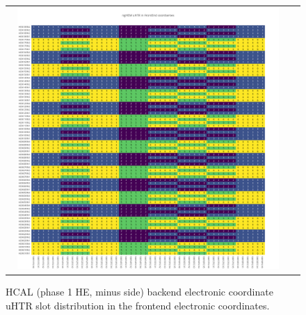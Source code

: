 \begin{figure}[htb]
 \begin{center}
  \begin{tabular}{cc}
   \includegraphics[angle=0,width=0.95\textwidth]{figures/appendix/ngHEM_uHTR_in_FrontEnd.png}
  \end{tabular}
  \caption{HCAL (phase 1 HE, minus side) backend electronic coordinate uHTR slot distribution in the frontend electronic coordinates.}
  \label{fig:lmapngHEMuHTRFEC}
 \end{center}
\end{figure}
\clearpage


